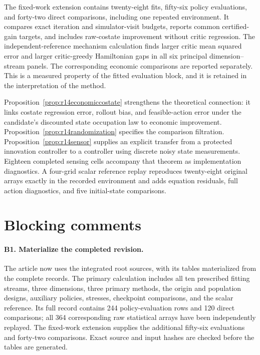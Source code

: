 The fixed-work extension contains twenty-eight fits, fifty-six policy evaluations, and forty-two direct comparisons, including one repeated environment. It compares exact iteration and simulator-visit budgets, reports common certified-gain targets, and includes raw-costate improvement without critic regression. The independent-reference mechanism calculation finds larger critic mean squared error and larger critic-greedy Hamiltonian gaps in all six principal dimension--stream panels. The corresponding economic comparisons are reported separately. This is a measured property of the fitted evaluation block, and it is retained in the interpretation of the method.

Proposition~\ref{prop:r14economiccostate} strengthens the theoretical connection: it links costate regression error, rollout bias, and feasible-action error under the candidate's discounted state occupation law to economic improvement. Proposition~\ref{prop:r14randomization} specifies the comparison filtration. Proposition~\ref{prop:r14sensor} supplies an explicit transfer from a protected innovation controller to a controller using discrete noisy state measurements. Eighteen completed sensing cells accompany that theorem as implementation diagnostics. A four-grid scalar reference replay reproduces twenty-eight original arrays exactly in the recorded environment and adds equation residuals, full action diagnostics, and five initial-state comparisons.

\section*{Blocking comments}

\paragraph*{B1. Materialize the completed revision.}
The article now uses the integrated root sources, with its tables materialized from the complete records. The primary calculation includes all ten prescribed fitting streams, three dimensions, three primary methods, the origin and population designs, auxiliary policies, stresses, checkpoint comparisons, and the scalar reference. Its full record contains 244 policy-evaluation rows and 120 direct comparisons; all 364 corresponding raw statistical arrays have been independently replayed. The fixed-work extension supplies the additional fifty-six evaluations and forty-two comparisons. Exact source and input hashes are checked before the tables are generated.

